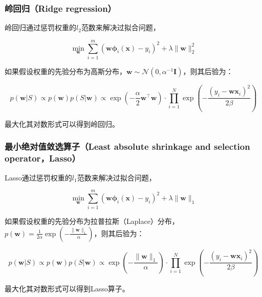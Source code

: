 \documentclass{article}
\begin{document}
\subsubsection{岭回归（Ridge regression）}

	岭回归通过惩罚权重的$l_2$范数来解决过拟合问题，
	
	\begin{equation*}
	\min_\mathbf{w} \sum_{i=1}^m (\mathbf{w\phi}_i(\mathbf{x}) - y_i)^2 + \lambda\|\mathbf{w}\|^2_2
	\end{equation*}

	如果假设权重的先验分布为高斯分布，$\mathbf{w}\sim\mathcal{N}(0,\alpha^{-1}\mathbf{I})$，则其后验为：
	
	\begin{equation}
	p(\mathbf{w}|S) \propto p(\mathbf{w}) p(S|\mathbf{w}) \propto \exp \left( -\frac{\alpha}{2} \mathbf{w}^\top \mathbf{w} \right) \cdot \prod_{i=1}^N \exp \left( -\frac{(y_i-\mathbf{wx}_i)^2}{2\beta} \right) 
	\end{equation}
	
最大化其对数形式可以得到岭回归。
	
	
\subsubsection{最小绝对值敛选算子（Least absolute shrinkage and selection operator，Lasso）}

	Lasso通过惩罚权重的$l_1$范数来解决过拟合问题，
		
	\begin{equation*}
	\min_\mathbf{w} \sum_{i=1}^m (\mathbf{w\phi}_i(\mathbf{x}) - y_i)^2 + \lambda\|\mathbf{w}\|_1
	\end{equation*}
	
	如果假设权重的先验分布为拉普拉斯（Laplace）分布，$p(\mathbf{w})=\frac{1}{2\alpha} \exp \left( -\frac{\|\mathbf{w}\|_1}{\alpha} \right)$，则其后验为：
	
	\begin{equation}
	p(\mathbf{w}|S) \propto p(\mathbf{w}) p(S|\mathbf{w}) \propto \exp \left( -\frac{\|\mathbf{w}\|_1}{\alpha} \right) \cdot \prod_{i=1}^N \exp \left( -\frac{(y_i-\mathbf{wx}_i)^2}{2\beta} \right)
	\end{equation}

最大化其对数形式可以得到Lasso算子。
\end{document}
